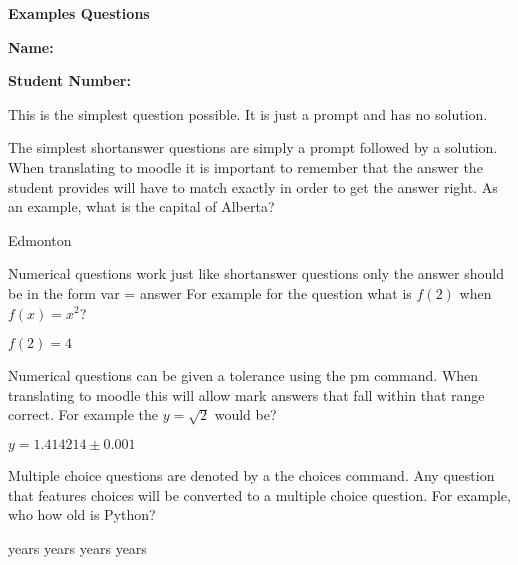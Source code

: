 \documentclass[12pt]{exam}
\begin{document}
        \begin{center}
            \textbf{Examples Questions}
        \end{center}

        \textbf{Name:} %

        \textbf{Student Number:} %

        \begin{questions}

                This is the simplest question possible. It is just a prompt and has no solution.

                The simplest shortanswer questions are simply a prompt followed by a solution. When translating to moodle
                it is important to remember that the answer the student provides will have to match exactly in order to
                get the answer right. As an example, what is the capital of Alberta?
                \begin{solution}
                    Edmonton
                \end{solution}

                Numerical questions work just like shortanswer questions only the answer should be in the form var = answer
                For example for the question what is $f(2)$ when $f(x) = x^2$?
                \begin{solution}
                    $f(2) = 4$
                \end{solution}

                Numerical questions can be given a tolerance using the pm command. When translating to moodle this
                will allow mark answers that fall within that range correct. For example the $y=\sqrt{2}$ would be?
                \begin{solution}
                    $y=1.414214 \pm 0.001$
                \end{solution}

                Multiple choice questions are denoted by a the choices command. Any question that features choices
                will be converted to a multiple choice question. For example, who how old is Python?
                \begin{choices}
                     years
                     years
                     years
                     years
                \end{choices}


\end{questions}
\end{document}
